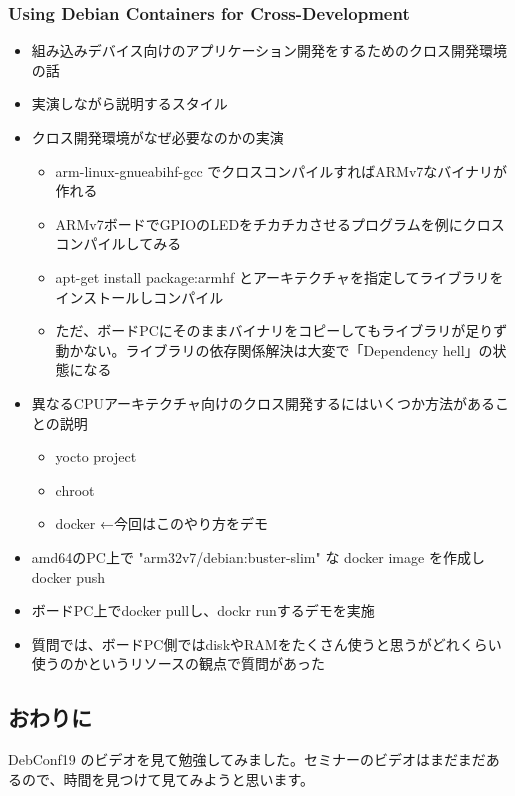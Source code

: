 \documentclass[mingoth,a4paper]{jsarticle}
\begin{document}
\subsubsection{Using Debian Containers for Cross-Development}

\begin{itemize}
\item 組み込みデバイス向けのアプリケーション開発をするためのクロス開発環境の話
\item 実演しながら説明するスタイル
\item クロス開発環境がなぜ必要なのかの実演
  \begin{itemize}
  \item arm-linux-gnueabihf-gcc でクロスコンパイルすればARMv7なバイナリが作れる
  \item ARMv7ボードでGPIOのLEDをチカチカさせるプログラムを例にクロスコンパイルしてみる
  \item apt-get install package:armhf とアーキテクチャを指定してライブラリをインストールしコンパイル
  \item ただ、ボードPCにそのままバイナリをコピーしてもライブラリが足りず動かない。ライブラリの依存関係解決は大変で「Dependency hell」の状態になる
  \end{itemize}
\item 異なるCPUアーキテクチャ向けのクロス開発するにはいくつか方法があることの説明
  \begin{itemize}
  \item yocto project
  \item chroot
  \item docker ←今回はこのやり方をデモ
  \end{itemize}
\item amd64のPC上で "arm32v7/debian:buster-slim" な docker image を作成し docker push
\item ボードPC上でdocker pullし、dockr runするデモを実施
\item 質問では、ボードPC側ではdiskやRAMをたくさん使うと思うがどれくらい使うのかというリソースの観点で質問があった
\end{itemize}

\subsection{おわりに}

DebConf19 のビデオを見て勉強してみました。セミナーのビデオはまだまだあるので、時間を見つけて見てみようと思います。

\end{document}
